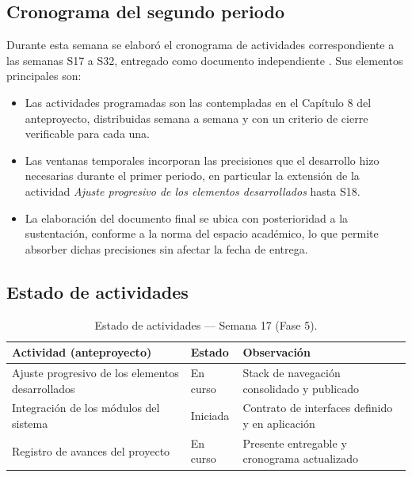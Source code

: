 \documentclass[12pt,letterpaper]{article}
\begin{document}
\subsection{Cronograma del segundo periodo}

Durante esta semana se elaboró el cronograma de actividades correspondiente a las semanas S17 a S32, entregado como documento independiente \cite{cronograma}. Sus elementos principales son:

\begin{itemize}
    \item Las actividades programadas son las contempladas en el Capítulo 8 del anteproyecto, distribuidas semana a semana y con un criterio de cierre verificable para cada una.
    \item Las ventanas temporales incorporan las precisiones que el desarrollo hizo necesarias durante el primer periodo, en particular la extensión de la actividad \textit{Ajuste progresivo de los elementos desarrollados} hasta S18.
    \item La elaboración del documento final se ubica con posterioridad a la sustentación, conforme a la norma del espacio académico, lo que permite absorber dichas precisiones sin afectar la fecha de entrega.
\end{itemize}

\subsection{Estado de actividades}

\begin{table}[H]
    \centering
    \small
    \caption{Estado de actividades --- Semana 17 (Fase 5).}
    \label{tab:estado_s17}
    \begin{tabular}{@{}p{6.3cm}ll@{}}
        \toprule
        \textbf{Actividad (anteproyecto)} & \textbf{Estado} & \textbf{Observación} \\ \midrule
        Ajuste progresivo de los elementos desarrollados & En curso & Stack de navegación consolidado y publicado \\ \addlinespace
        Integración de los módulos del sistema & Iniciada & Contrato de interfaces definido y en aplicación \\ \addlinespace
        Registro de avances del proyecto & En curso & Presente entregable y cronograma actualizado \\ \bottomrule
    \end{tabular}
\end{table}
\end{document}
